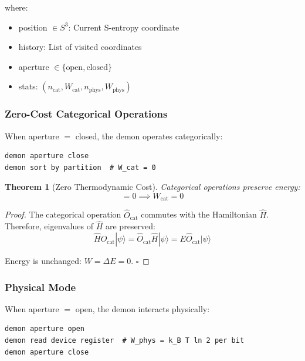 \documentclass[twocolumn,10pt]{article}
\newtheorem{theorem}{Theorem}[section]
\theoremstyle{definition}
\theoremstyle{remark}
\begin{document}
where:
\begin{itemize}
    \item position $\in S^3$: Current S-entropy coordinate
    \item history: List of visited coordinates
    \item aperture $\in \{\text{open}, \text{closed}\}$
    \item stats: $(n_{\text{cat}}, W_{\text{cat}}, n_{\text{phys}}, W_{\text{phys}})$
\end{itemize}

\subsubsection{Zero-Cost Categorical Operations}

When aperture $= $ closed, the demon operates categorically:
\begin{lstlisting}
demon aperture close
demon sort by partition  # W_cat = 0
\end{lstlisting}

\begin{theorem}[Zero Thermodynamic Cost]
Categorical operations preserve energy:
\begin{equation}
    [\hat{O}_{\text{cat}}, \hat{H}] = 0 \implies W_{\text{cat}} = 0
\end{equation}
\end{theorem}

\begin{proof}
The categorical operation $\hat{O}_{\text{cat}}$ commutes with the Hamiltonian $\hat{H}$. Therefore, eigenvalues of $\hat{H}$ are preserved:
\begin{equation}
    \hat{H}\hat{O}_{\text{cat}}|\psi\rangle = \hat{O}_{\text{cat}}\hat{H}|\psi\rangle = E \hat{O}_{\text{cat}}|\psi\rangle
\end{equation}

Energy is unchanged: $W = \Delta E = 0$. $\square$
\end{proof}

\subsubsection{Physical Mode}

When aperture $= $ open, the demon interacts physically:
\begin{lstlisting}
demon aperture open
demon read device register  # W_phys = k_B T ln 2 per bit
demon aperture close
\end{lstlisting}
\end{document}
